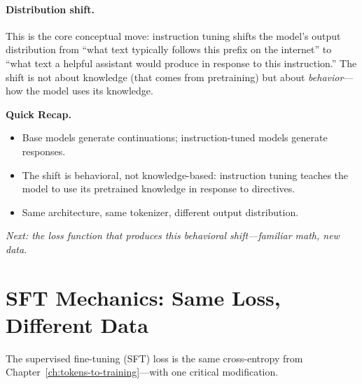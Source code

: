 \paragraph{Distribution shift.} This is the core conceptual move: instruction tuning shifts the model's output distribution from ``what text typically follows this prefix on the internet'' to ``what text a helpful assistant would produce in response to this instruction.'' The shift is not about knowledge (that comes from pretraining) but about \emph{behavior}---how the model uses its knowledge.

\noindent{}

\begin{quickrecap}
\textbf{Quick Recap.}
\begin{itemize}[nosep,leftmargin=1.5em]
  \item Base models generate continuations; instruction-tuned models generate responses.
  \item The shift is behavioral, not knowledge-based: instruction tuning teaches the model to use its pretrained knowledge in response to directives.
  \item Same architecture, same tokenizer, different output distribution.
\end{itemize}
\textit{Next: the loss function that produces this behavioral shift---familiar math, new data.}
\end{quickrecap}


\section{SFT Mechanics: Same Loss, Different Data}
\label{sec:sft-mechanics}

The supervised fine-tuning (SFT) loss is the same cross-entropy from Chapter~\ref{ch:tokens-to-training}---with one critical modification.

